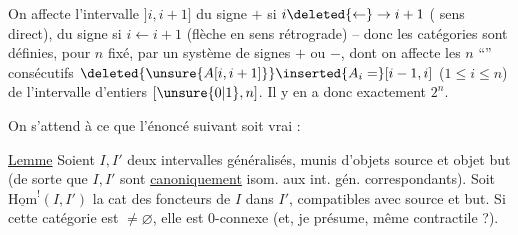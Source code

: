 On affecte l'intervalle $]i,i+1]$ du signe $+$ si
$i\deleted{\leftarrow}\to i+1$ ( sens direct), du signe  si
$i\leftarrow i+1$ (flèche en sens rétrograde) -- donc
les catégories  sont définies, pour $n$ fixé,
par un système de signes $+$ ou $-$, dont on affecte
les $n$ ``'' consécutifs $\deleted{\unsure{A[i,i+1]}}\inserted{A_i=}[i-1,i]$ ($1\leq i\leq n$)
de l'intervalle d'entiers $[\unsure{0|1},n]$. Il y en a
donc exactement $2^n$.

On s'attend à ce que l'énoncé suivant soit
vrai :

\uline{Lemme} \quad Soient $I,I'$ deux intervalles généralisés,
munis d'objets source et objet but (de sorte que
$I,I'$ sont \uline{canoniquement} isom. aux int. gén.
 correspondants). Soit $\underline{\mathrm{Hom}}^!(I,I')$
la cat des foncteurs de $I$ dans $I'$, compatibles
avec source et but. Si cette catégorie est $\ne\varnothing$,
elle est $0$-connexe (et, je présume, même
contractile ?).

